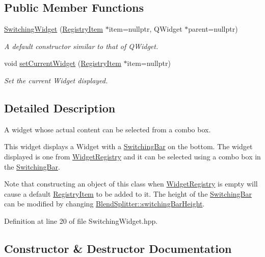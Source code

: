 \subsection*{Public Member Functions}
\begin{DoxyCompactItemize}
\item 
\hyperlink{class_switching_widget_abbc74406fa04004867e2834ceb43e66e}{Switching\+Widget} (\hyperlink{class_registry_item}{Registry\+Item} $\ast$item=nullptr, Q\+Widget $\ast$parent=nullptr)
\begin{DoxyCompactList}\small\item\em A default constructor similar to that of Q\+Widget. \end{DoxyCompactList}\item 
void \hyperlink{class_switching_widget_ad0b143c60e046819c3ad82c5279584ba}{set\+Current\+Widget} (\hyperlink{class_registry_item}{Registry\+Item} $\ast$item=nullptr)
\begin{DoxyCompactList}\small\item\em Set the current Widget displayed. \end{DoxyCompactList}\end{DoxyCompactItemize}


\subsection{Detailed Description}
A widget whose actual content can be selected from a combo box. 

This widget displays a Widget with a \hyperlink{class_switching_bar}{Switching\+Bar} on the bottom. The widget displayed is one from \hyperlink{class_widget_registry}{Widget\+Registry} and it can be selected using a combo box in the \hyperlink{class_switching_bar}{Switching\+Bar}.

Note that constructing an object of this class when \hyperlink{class_widget_registry}{Widget\+Registry} is empty will cause a default \hyperlink{class_registry_item}{Registry\+Item} to be added to it. The height of the \hyperlink{class_switching_bar}{Switching\+Bar} can be modified by changing \hyperlink{class_blend_splitter_a478fa3cfcf59f76edf8f021bee297e0d}{Blend\+Splitter\+::switching\+Bar\+Height}. 

Definition at line 20 of file Switching\+Widget.\+hpp.



\subsection{Constructor \& Destructor Documentation}
\hypertarget{class_switching_widget_abbc74406fa04004867e2834ceb43e66e}{}\label{class_switching_widget_abbc74406fa04004867e2834ceb43e66e} 
